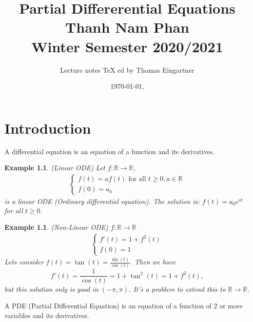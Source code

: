 \documentclass{report}
\title{Partial Differerential Equations \\ Thanh Nam Phan \\ Winter Semester 2020/2021}
\author{Lecture notes \TeX{} ed by Thomas Eingartner}
\date{\today, \currenttime}
\theoremstyle{tommy}
\newtheorem{eg}[defn]{Example}
\begin{document}
\maketitle
\tableofcontents
\newpage



\chapter{Introduction}

A differential equation is an equation of a function and its derivatives. 

\begin{eg} (Linear ODE)
  Let \(f: \mathbb{R} \to \mathbb{R}\),
  \begin{align*}
    \begin{cases}
      f(t) = a f(t) \text{ for all } t \ge 0, a \in \mathbb{R} \\
      f(0) = a_0
    \end{cases}
  \end{align*}
  is a linear ODE (Ordinary differential equation). The solution is: \(f(t) = a_0 e^{at}\) for all \(t \ge 0\).
\end{eg}

\begin{eg} (Non-Linear ODE) \(f: \mathbb{R} \to \mathbb{R}\)
  \begin{align*}
    \begin{cases}
      f'(t) = 1 + f^2(t) \\
      f(0) = 1
    \end{cases}
  \end{align*}
  Lets consider \(f(t) = \tan(t) = \frac{\sin(t)}{\cos(t)}\). Then we have \[f'(t) = \frac{1}{\cos(t)} = 1 + \tan^2(t) = 1 + f^2(t),\] but this solution only is \emph{good} in \((- \pi, \pi)\). It's a problem to extend this to \(\mathbb{R} \to \mathbb{R}\).
\end{eg}

A PDE (Partial Differential Equation) is an equation of a function of 2 or more variables and its derivatives.
\end{document}
